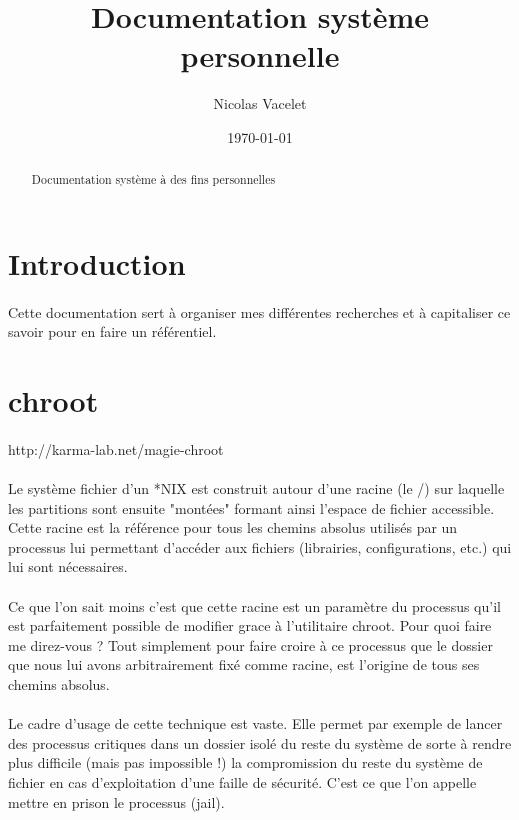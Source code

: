 \documentclass{article}
\title{Documentation système personnelle}
\author{Nicolas Vacelet}
\date{\today}
\begin{document}
\maketitle

\begin{abstract}
    \centering Documentation système à des fins personnelles
\end{abstract}

\tableofcontents
\newpage

\section{Introduction}
\paragraph{}
Cette documentation sert à organiser mes différentes recherches et à capitaliser ce savoir pour en faire un référentiel.

\section{chroot}\label{chroot}
\paragraph{}http://karma-lab.net/magie-chroot
\paragraph{}Le système fichier d'un *NIX est construit autour d'une racine (le /) sur laquelle les partitions sont ensuite "montées" formant ainsi l'espace de fichier accessible. Cette racine est la référence pour tous les chemins absolus utilisés par un processus lui permettant d'accéder aux fichiers (librairies, configurations, etc.) qui lui sont nécessaires.
\paragraph{}Ce que l'on sait moins c'est que cette racine est un paramètre du processus qu'il est parfaitement possible de modifier grace à l'utilitaire chroot. Pour quoi faire me direz-vous ? Tout simplement pour faire croire à ce processus que le dossier que nous lui avons arbitrairement fixé comme racine, est l'origine de tous ses chemins absolus.
\paragraph{}Le cadre d'usage de cette technique est vaste. Elle permet par exemple de lancer des processus critiques dans un dossier isolé du reste du système de sorte à rendre plus difficile (mais pas impossible !) la compromission du reste du système de fichier en cas d'exploitation d'une faille de sécurité. C'est ce que l'on appelle mettre en prison le processus (jail).
\end{document}
